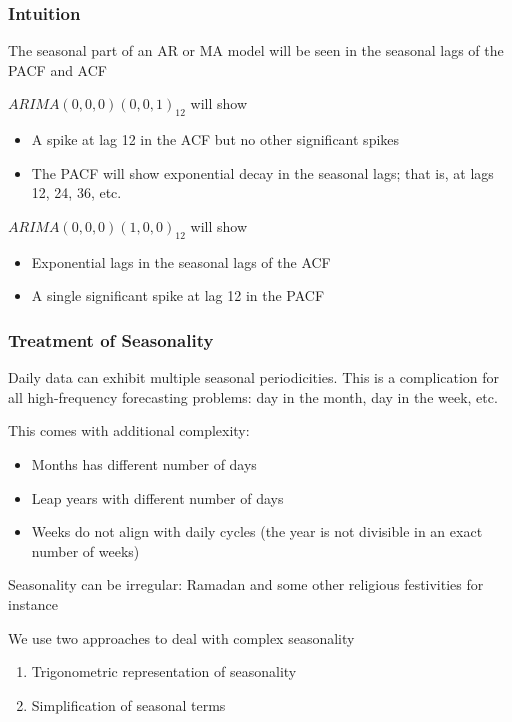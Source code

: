 \documentclass{beamer}
\newenvironment{wideitemize}{\itemize\addtolength{\itemsep}{10pt}}{\enditemize}
\begin{document}
\begin{frame}
  \frametitle{Intuition}

  The seasonal part of an AR or MA model will be seen in the seasonal lags of the PACF and ACF


  \begin{exampleblock}{$ARIMA(0,0,0)(0,0,1)_{12}$  will show}

    \begin{itemize}
    \item A spike at lag 12 in the ACF but no other significant spikes
    \item The PACF will show exponential decay in the seasonal lags; that is, at lags 12, 24, 36, etc.
    \end{itemize}
    
  \end{exampleblock}
  
\medskip

  \begin{exampleblock}{$ARIMA(0,0,0)(1,0,0)_{12}$  will show}

    \begin{itemize}
    \item Exponential lags in the seasonal lags of the ACF
    \item A single significant spike at lag 12 in the PACF
    \end{itemize}
    
  \end{exampleblock}

\end{frame}


\begin{frame}
  \frametitle{Treatment of Seasonality}

  \begin{wideitemize}
    \item Daily data can exhibit multiple seasonal periodicities. This is a complication for all high-frequency forecasting problems: day in the month, day in the week, etc.
    \item This comes with additional complexity:
      \begin{itemize}
        \item Months has different number of days
        \item Leap years with different number of days
        \item Weeks do not align with daily cycles (the year is not divisible in an exact number of weeks)
        \end{itemize}
      \item Seasonality can be irregular: Ramadan and some other religious festivities for instance
      \item We use two approaches to deal with complex seasonality
        \begin{enumerate}
        \item Trigonometric representation of seasonality
        \item Simplification of seasonal terms
        \end{enumerate}
  \end{wideitemize}
  
\end{frame}
\end{document}
